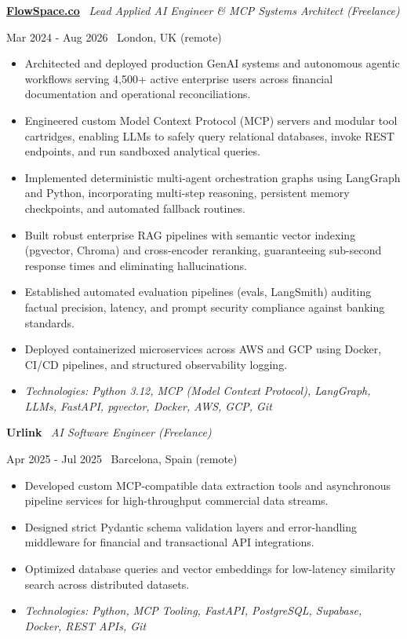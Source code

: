 \documentclass[a4paper,10pt]{article}
\newcommand{\role}[4]{%
  \vspace{2pt}\noindent
  \begin{minipage}[t]{0.70\textwidth}\raggedright\textbf{#1} \textbullet\ \textit{#3}\end{minipage}%
  \hfill
  \begin{minipage}[t]{0.28\textwidth}\raggedleft\footnotesize\color{gray}#2 \textbullet\ #4\end{minipage}%
  \vspace{1pt}%
}
\begin{document}
\role{\href{https://flowspace.co}{FlowSpace.co}}{Mar 2024 - Aug 2026}{Lead Applied AI Engineer \& MCP Systems Architect (Freelance)}{London, UK (remote)}
\begin{itemize}
  \item Architected and deployed production GenAI systems and autonomous agentic workflows serving 4,500+ active enterprise users across financial documentation and operational reconciliations.
  \item Engineered custom Model Context Protocol (MCP) servers and modular tool cartridges, enabling LLMs to safely query relational databases, invoke REST endpoints, and run sandboxed analytical queries.
  \item Implemented deterministic multi-agent orchestration graphs using LangGraph and Python, incorporating multi-step reasoning, persistent memory checkpoints, and automated fallback routines.
  \item Built robust enterprise RAG pipelines with semantic vector indexing (pgvector, Chroma) and cross-encoder reranking, guaranteeing sub-second response times and eliminating hallucinations.
  \item Established automated evaluation pipelines (evals, LangSmith) auditing factual precision, latency, and prompt security compliance against banking standards.
  \item Deployed containerized microservices across AWS and GCP using Docker, CI/CD pipelines, and structured observability logging.
  \item \textit{Technologies: Python 3.12, MCP (Model Context Protocol), LangGraph, LLMs, FastAPI, pgvector, Docker, AWS, GCP, Git}
\end{itemize}

\role{Urlink}{Apr 2025 - Jul 2025}{AI Software Engineer (Freelance)}{Barcelona, Spain (remote)}
\begin{itemize}
  \item Developed custom MCP-compatible data extraction tools and asynchronous pipeline services for high-throughput commercial data streams.
  \item Designed strict Pydantic schema validation layers and error-handling middleware for financial and transactional API integrations.
  \item Optimized database queries and vector embeddings for low-latency similarity search across distributed datasets.
  \item \textit{Technologies: Python, MCP Tooling, FastAPI, PostgreSQL, Supabase, Docker, REST APIs, Git}
\end{itemize}
\end{document}
